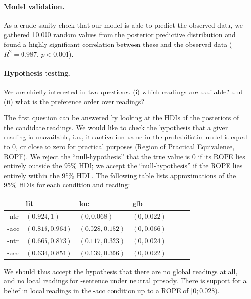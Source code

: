 \documentclass[fleqn,reqno,10pt]{article}
\newcommand{\as}{\acro{as}}
\renewcommand{\es}{\acro{es}}
\begin{document}
\paragraph{Model validation.} As a crude sanity check that our model
is able to predict the observed data, we gathered 10.000 random values
from the posterior predictive distribution and found a highly
significant correlation between these and the observed data ($R^2 =
0.987$, $p < 0.001$).

\paragraph{Hypothesis testing.} We are chiefly interested in two
questions: (i) which readings are available? and (ii) what is the
preference order over readings?

The first question can be answered by looking at the HDIs of the
posteriors of the candidate readings. We would like to check the
hypothesis that a given reading is unavailable, i.e., its activation
value in the probabilistic model is equal to 0, or close to zero for
practical purposes (Region of Practical Equivalence, ROPE). We reject
the ``null-hypothesis'' that the true value is 0 if its ROPE lies
entirely outside the 95\% HDI; we accept the ``null-hypothesis'' if
the ROPE lies entirely within the 95\% HDI
\citep[][Ch.~12]{Kruschke2011:Doing-Bayesian-}. The following table
lists approximations of the 95\% HDIs for each condition and reading:

\begin{center}
  \begin{tabular}{lllllll}
    & lit & loc & glb & \\ \midrule
    \as-ntr & $(0.924 , 1)$ & $(0 , 0.068)$
    & $(0 , 0.022)$ \\
    \as-acc 
    & $(0.816 , 0.964)$
    & $(0.028 , 0.152)$
    & $(0 , 0.066)$ \\
    \es-ntr 
    & $(0.665 , 0.873)$
    & $(0.117 , 0.323)$
    & $(0 , 0.024)$ \\
    \es-acc 
    & $(0.634 , 0.851)$
    & $(0.139 , 0.356)$
    & $(0 , 0.022)$ 
  \end{tabular}
\end{center}

\noindent We should thus accept the hypothesis that there are no
global readings at all, and no local readings for \as-sentence under
neutral prosody. There is support for a belief in local readings in
the \as-acc condition up to a ROPE of $[0;0.028)$.
\end{document}
